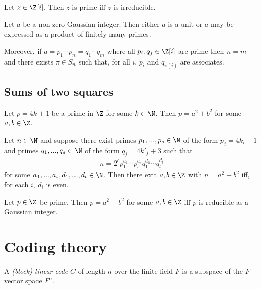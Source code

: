 \documentclass{article}
\begin{document}
\begin{theorem}[Lectures 15-16]
	Let $z\in\Z[i]$. Then $z$ is prime iff $z$ is irreducible.
\end{theorem}

\begin{theorem}
	Let $a$ be a non-zero Gaussian integer. Then either $a$ is a unit or $a$ may be expressed
	as a product of finitely many primes.

	Moreover, if $a=p_1\cdots p_n=q_1\cdots q_m$ where all $p_i,q_j\in\Z[i]$ are prime then
	$n=m$ and there exists $\pi\in S_n$ such that, for all $i$, $p_i$ and $q_{\pi(i)}$ are associates.
\end{theorem}

\subsection{Sums of two squares}

\begin{theorem}[Lectures 15-16]
	Let $p=4k+1$ be a prime in $\Z$ for some $k\in\N$. Then $p=a^2+b^2$ for some
	$a,b\in\Z$.
\end{theorem}

\begin{theorem}[Lectures 15-16]
	Let $n\in\N$ and suppose there exist primes $p_1,...,p_s\in\N$ of the form
	$p_i=4k_i+1$ and primes $q_1,...,q_s\in\N$ of the form $q_j=4k'_j+3$ such that
	\begin{align*}
		n=2^c p_1^{a_1}\cdots p_s^{a_s} q_1^{d_1}\cdots q_t^{d_t}
	\end{align*}
	for some $a_1,...,a_s,d_1,...,d_t\in\N$. Then there exit $a,b\in\Z$ with
	$n=a^2+b^2$ iff, for each $i$, $d_i$ is even.
\end{theorem}

\begin{lemma}[Lectures 15-16]
	Let $p\in\Z$ be prime. Then $p=a^2+b^2$ for some $a,b\in\Z$ iff $p$ is reducible
	as a Gaussian integer.
\end{lemma}

\section{Coding theory}

\begin{definition}[Lecture 9]
	A \emph{(block) linear code} $C$ of length $n$ over the finite field $F$ is a subspace of the
	$F$-vector space $F^n$.
\end{definition}
\end{document}
